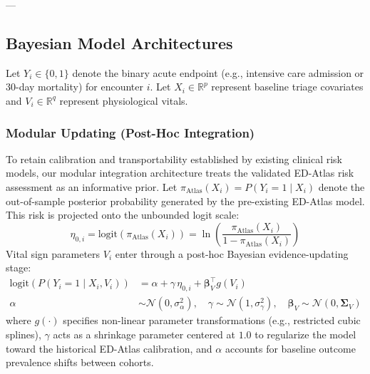 ---

\subsection{Bayesian Model Architectures}
\label{subsec:bayesian_models}

Let $Y_i \in \{0, 1\}$ denote the binary acute endpoint (e.g., intensive care admission or 30-day mortality) for encounter $i$. Let $X_i \in \mathbb{R}^p$ represent baseline triage covariates and $V_i \in \mathbb{R}^q$ represent physiological vitals.

\subsubsection{Modular Updating (Post-Hoc Integration)}
To retain calibration and transportability established by existing clinical risk models, our modular integration architecture treats the validated ED-Atlas risk assessment as an informative prior. Let $\pi_{\text{Atlas}}(X_i) = P(Y_i = 1 \mid X_i)$ denote the out-of-sample posterior probability generated by the pre-existing ED-Atlas model. This risk is projected onto the unbounded logit scale:
\begin{equation}
    \eta_{0, i} = \text{logit}(\pi_{\text{Atlas}}(X_i)) = \ln\left(\frac{\pi_{\text{Atlas}}(X_i)}{1 - \pi_{\text{Atlas}}(X_i)}\right)
\end{equation}
Vital sign parameters $V_i$ enter through a post-hoc Bayesian evidence-updating stage:
\begin{align}
    \text{logit}(P(Y_i = 1 \mid X_i, V_i)) &= \alpha + \gamma \, \eta_{0, i} + \boldsymbol{\beta}_V^\top g(V_i) \\
    \alpha &\sim \mathcal{N}(0, \sigma^2_\alpha), \quad \gamma \sim \mathcal{N}(1, \sigma^2_\gamma), \quad \boldsymbol{\beta}_V \sim \mathcal{N}(0, \boldsymbol{\Sigma}_V)
\end{align}
where $g(\cdot)$ specifies non-linear parameter transformations (e.g., restricted cubic splines), $\gamma$ acts as a shrinkage parameter centered at $1.0$ to regularize the model toward the historical ED-Atlas calibration, and $\alpha$ accounts for baseline outcome prevalence shifts between cohorts.

